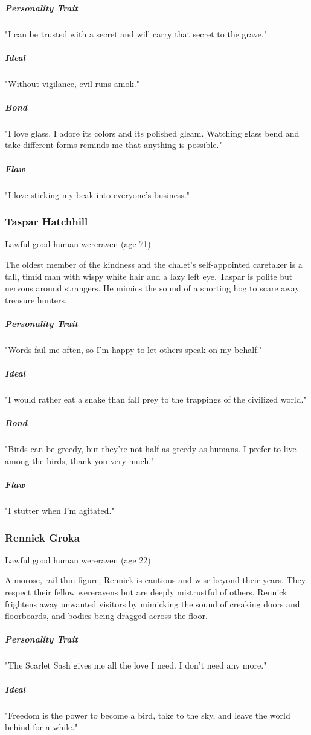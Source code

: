 \documentclass[10pt,a4paper,twoside,bg=print,twocolumn,openany,nodeprecatedcode]{dndbook}
\begin{document}
\subparagraph{Personality Trait}
"I can be trusted with a secret and will carry that secret to the grave."

\subparagraph{Ideal}
"Without vigilance, evil runs amok."

\subparagraph{Bond}
"I love glass. I adore its colors and its polished gleam. Watching glass bend and take different forms reminds me that anything is possible."

\subparagraph{Flaw}
"I love sticking my beak into everyone's business."

\subsubsection{Taspar Hatchhill}
Lawful good human wereraven (age 71)

The oldest member of the kindness and the chalet's self-appointed caretaker is a tall, timid man with wispy white hair and a lazy left eye. Taspar is polite but nervous around strangers. He mimics the sound of a snorting hog to scare away treasure hunters.

\subparagraph{Personality Trait}
"Words fail me often, so I'm happy to let others speak on my behalf."

\subparagraph{Ideal}
"I would rather eat a snake than fall prey to the trappings of the civilized world."

\subparagraph{Bond}
"Birds can be greedy, but they're not half as greedy as humans. I prefer to live among the birds, thank you very much."

\subparagraph{Flaw}
"I stutter when I'm agitated."

\subsubsection{Rennick Groka}
Lawful good human wereraven (age 22)

A morose, rail-thin figure, Rennick is cautious and wise beyond their years. They respect their fellow wereravens but are deeply mistrustful of others. Rennick frightens away unwanted visitors by mimicking the sound of creaking doors and floorboards, and bodies being dragged across the floor.

\subparagraph{Personality Trait}
"The Scarlet Sash gives me all the love I need. I don't need any more."

\subparagraph{Ideal}
"Freedom is the power to become a bird, take to the sky, and leave the world behind for a while."
\end{document}
